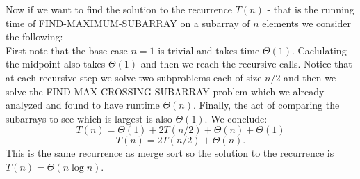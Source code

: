 \documentclass{scrartcl}
\theoremstyle{definition}
\theoremstyle{definition}
\theoremstyle{remark}
\numberwithin{equation}{section}
\begin{document}
Now if we want to find the solution to the recurrence $T(n)$ - that is the running time of FIND-MAXIMUM-SUBARRAY on a subarray of $n$ elements we consider the following:\\
First note that the base case $n=1$ is trivial and takes time $\Theta(1)$. Caclulating the midpoint also takes $\Theta(1)$ and then we reach the recursive calls. Notice that at each recursive step we solve two subproblems each of size $n/2$ and then we solve the FIND-MAX-CROSSING-SUBARRAY problem which we already analyzed and found to have runtime $\Theta(n)$. Finally, the act of comparing the subarrays to see which is largest is also $\Theta(1)$. We conclude:\\
$$T(n)=\Theta(1)+2T(n/2)+\Theta(n)+\Theta(1)$$
$$T(n)=2T(n/2)+\Theta(n).$$
This is the same recurrence as merge sort so the solution to the recurrence is $T(n)=\Theta(n\log n)$.
\end{document}
